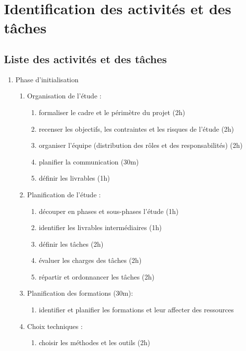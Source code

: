 \chapter{Identification des activités et des tâches}

\section{Liste des activités et des tâches}

\begin{enumerate}
  \item Phase d'initialisation
          \begin{enumerate}
            \item Organisation de l'étude :
              \begin{enumerate}
                  \item formaliser le cadre et le périmètre du projet (2h)
                  \item  recenser les objectifs, les contraintes et les risques de l'étude (2h)
                  \item  organiser l'équipe (distribution des rôles et des responsabilités) (2h)
                  \item  planifier la communication (30m)
                  \item  définir les livrables (1h)
              \end{enumerate}
            \item Planification de l'étude : 
              \begin{enumerate}
                  \item  découper en phases et sous-phases l'étude (1h)
                  \item  identifier les livrables intermédiaires (1h)
                  \item  définir les tâches (2h)
                  \item  évaluer les charges des tâches (2h)
                  \item  répartir et ordonnancer les tâches (2h)
              \end{enumerate}

            \item Planification des formations (30m):
                \begin{enumerate}
                  \item identifier et planifier les formations et leur affecter des ressources
                \end{enumerate}
            \item Choix techniques : 
                \begin{enumerate}
                  \item choisir les méthodes et les outils (2h)
                \end{enumerate}


\end{enumerate}
\end{enumerate}
